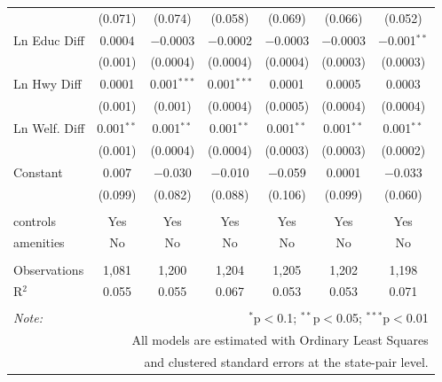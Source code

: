 \begin{table}[!htbp]
\begin{tabular}{@{\extracolsep{5pt}}lcccccc}
  & (0.071) & (0.074) & (0.058) & (0.069) & (0.066) & (0.052) \\ 
  Ln Educ Diff & 0.0004 & $-$0.0003 & $-$0.0002 & $-$0.0003 & $-$0.0003 & $-$0.001$^{**}$ \\ 
  & (0.001) & (0.0004) & (0.0004) & (0.0004) & (0.0003) & (0.0003) \\ 
  Ln Hwy Diff & 0.0001 & 0.001$^{***}$ & 0.001$^{***}$ & 0.0001 & 0.0005 & 0.0003 \\ 
  & (0.001) & (0.001) & (0.0004) & (0.0005) & (0.0004) & (0.0004) \\ 
  Ln Welf. Diff & 0.001$^{**}$ & 0.001$^{**}$ & 0.001$^{**}$ & 0.001$^{**}$ & 0.001$^{**}$ & 0.001$^{**}$ \\ 
  & (0.001) & (0.0004) & (0.0004) & (0.0003) & (0.0003) & (0.0002) \\ 
  Constant & 0.007 & $-$0.030 & $-$0.010 & $-$0.059 & 0.0001 & $-$0.033 \\ 
  & (0.099) & (0.082) & (0.088) & (0.106) & (0.099) & (0.060) \\ 
 \hline \\[-1.8ex] 
controls & Yes & Yes & Yes & Yes & Yes & Yes \\ 
amenities & No & No & No & No & No & No \\ 
\hline \\[-1.8ex] 
Observations & 1,081 & 1,200 & 1,204 & 1,205 & 1,202 & 1,198 \\ 
R$^{2}$ & 0.055 & 0.055 & 0.067 & 0.053 & 0.053 & 0.071 \\ 
\hline 
\hline \\[-1.8ex] 
\textit{Note:}  & \multicolumn{6}{r}{$^{*}$p$<$0.1; $^{**}$p$<$0.05; $^{***}$p$<$0.01} \\ 
 & \multicolumn{6}{r}{All models are estimated with Ordinary Least Squares} \\ 
 & \multicolumn{6}{r}{and clustered standard errors at the state-pair level.} \\ 
\end{tabular} 
\end{table} 
